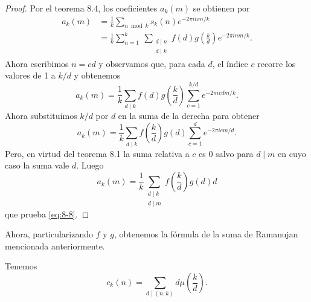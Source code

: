 \documentclass[12pt,a4paper]{book}
\begin{document}
    \begin{proof}
        Por el teorema 8.4, los coeficientes $a_{k}(m)$ se obtienen por
        \begin{align*}
            a_{k}(m)&=\frac{1}{k}\sum_{n\bmod k}s_{k}(n)e^{-2\pi inm/k}\\
            &=\frac{1}{k}\sum_{n=1}^{k}\ \sum_{\substack{d\mid n\\d\mid k}}f(d)g\left(\frac{k}{d}\right)e^{-2\pi inm/k}.
        \end{align*}
        Ahora escribimos $n=cd$ y observamos que, para cada $d$, el índice $c$ recorre los
        valores de 1 a $k/d$ y obtenemos
        \begin{equation*}
            a_{k}(m)=\frac{1}{k}\sum_{d\mid k}f(d)g\left(\frac{k}{d}\right)\sum_{c=1}^{k/d}e^{-2\pi icdm/k}.
        \end{equation*}
        Ahora substituimos $k/d$ por $d$ en la suma de la derecha para obtener
        \begin{equation*}
            a_{k}(m)=\frac{1}{k}\sum_{d\mid k}f\left(\frac{k}{d}\right)g(d)\sum_{c=1}^{d}e^{-2\pi icm/d}.
        \end{equation*}
        Pero, en virtud del teorema 8.1 la suma relativa a $c$ es 0 salvo para $d\mid m$ en
        cuyo caso la suma vale $d$. Luego
        \begin{equation*}
            a_{k}(m)=\frac{1}{k}\sum_{\substack{d\mid k\\d\mid m}}f\left(\frac{k}{d}\right)g(d)d
        \end{equation*}
        que prueba \eqref{eq:8-8}.
    \end{proof}

    Ahora, particularizando $f$ y $g$, obtenemos la fórmula de la suma de Ramanujan
    mencionada anteriormente.

    \begin{teorema}
        Tenemos
        \begin{equation*}
            c_{k}(n)=\sum_{d\mid(n,k)}d\mu\left(\frac{k}{d}\right).
        \end{equation*}
    \end{teorema}
\end{document}
